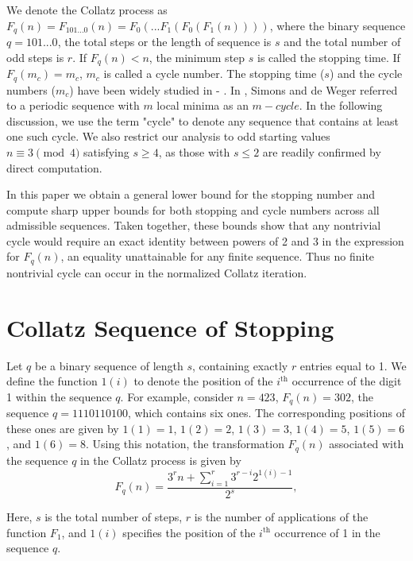 \documentclass{amsart}
\theoremstyle{definition}
\theoremstyle{remark}
\numberwithin{equation}{section}
\begin{document}
We denote the Collatz process as $F_q(n)=F_{101...0}(n)=F_0(...F_1(F_0(F_1(n))))$, where the binary sequence $q=101...0$, the total steps or the length of sequence is $s$ and the total number of odd steps is $r$. If $F_q(n)<n$, the minimum step $s$ is called the stopping time. If $F_q(m_c)=m_c$, $m_c$ is called a cycle number. The stopping time ($s$) and the cycle numbers ($m_c$) have been widely studied in \cite{Si10} - \cite{He23}. In \cite{Si10}, Simons and de Weger referred to a periodic sequence with $m$ local minima as an $m-cycle$. In the following discussion, we use the term "cycle" to denote any sequence that contains at least one such cycle. We also restrict our analysis to odd starting values $n \equiv 3 \pmod{4}$ satisfying $s \geq 4$, as those with $s \leq 2$ are readily confirmed by direct computation.

In this paper we obtain a general lower bound for the stopping number and compute sharp upper bounds for both stopping and cycle numbers across all admissible sequences. Taken together, these bounds show that any nontrivial cycle would require an exact identity between powers of 2 and 3 in the expression for $F_q(n)$, an equality unattainable for any finite sequence. Thus no finite nontrivial cycle can occur in the normalized Collatz iteration.

\section{Collatz Sequence of Stopping}

Let $q$ be a binary sequence of length $s$, containing exactly $r$ entries equal to 1. We define the function $1(i)$ to denote the position of the $i^{\text{th}}$ occurrence of the digit 1 within the sequence $q$. For example, consider $n=423$, $F_q(n)=302$, the sequence $q = 1110110100$, which contains six ones. The corresponding positions of these ones are given by $1(1) = 1$, $1(2) = 2$, $1(3) = 3$, $1(4) = 5$, $1(5) = 6$, and $1(6) = 8$. Using this notation, the transformation $F_q(n)$ associated with the sequence $q$ in the Collatz process is given by
\begin{equation} \label{formula}
	F_q (n)=\dfrac{3^r n+\sum_{i=1}^r3^{r-i} 2^{1(i)-1}}{2^s},
\end{equation}

Here, $s$ is the total number of steps, $r$ is the number of applications of the function $F_1$, and $1(i)$ specifies the position of the $i^{\text{th}}$ occurrence of 1 in the sequence $q$.
\end{document}
